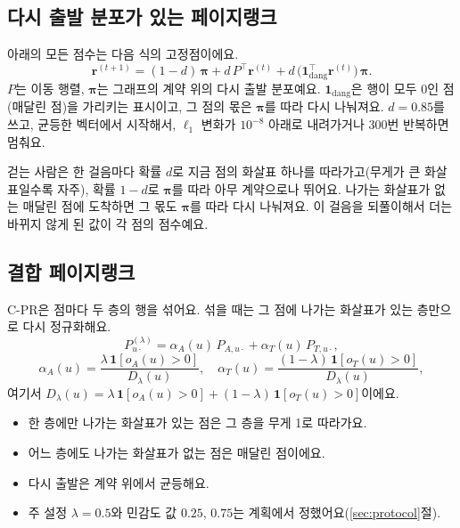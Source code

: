 \subsection{다시 출발 분포가 있는 페이지랭크}

아래의 모든 점수는 다음 식의 고정점이에요.
\begin{equation}
\mathbf r^{(t+1)}=(1-d)\,\boldsymbol\pi+d\,P^{\top}\mathbf r^{(t)}+d\,\bigl(\mathbf 1_{\mathrm{dang}}^{\top}\mathbf r^{(t)}\bigr)\,\boldsymbol\pi.
\label{eq:pr}
\end{equation}
$P$는 이동 행렬, $\boldsymbol\pi$는 그래프의 계약 위의 다시 출발 분포예요. $\mathbf 1_{\mathrm{dang}}$은 행이 모두 0인 점(매달린 점)을 가리키는 표시이고, 그 점의 몫은 $\boldsymbol\pi$를 따라 다시 나눠져요. $d=0.85$를 쓰고, 균등한 벡터에서 시작해서, $\ell_1$ 변화가 $10^{-8}$ 아래로 내려가거나 300번 반복하면 멈춰요.

\begin{puri}
걷는 사람은 한 걸음마다 확률 $d$로 지금 점의 화살표 하나를 따라가고(무게가 큰 화살표일수록 자주), 확률 $1-d$로 $\boldsymbol\pi$를 따라 아무 계약으로나 뛰어요. 나가는 화살표가 없는 매달린 점에 도착하면 그 몫도 $\boldsymbol\pi$를 따라 다시 나눠져요. 이 걸음을 되풀이해서 더는 바뀌지 않게 된 값이 각 점의 점수예요.
\end{puri}

\subsection{결합 페이지랭크}

C-PR은 점마다 두 층의 행을 섞어요. 섞을 때는 그 점에 나가는 화살표가 있는 층만으로 다시 정규화해요.
\begin{equation}
P^{(\lambda)}_{u\cdot}=\alpha_A(u)\,P_{A,u\cdot}+\alpha_T(u)\,P_{T,u\cdot},
\label{eq:cpr}
\end{equation}
\begin{equation}
\alpha_A(u)=\frac{\lambda\,\mathbf 1[o_A(u)>0]}{D_\lambda(u)},\quad
\alpha_T(u)=\frac{(1-\lambda)\,\mathbf 1[o_T(u)>0]}{D_\lambda(u)},
\label{eq:alpha}
\end{equation}
여기서 $D_\lambda(u)=\lambda\,\mathbf 1[o_A(u)>0]+(1-\lambda)\,\mathbf 1[o_T(u)>0]$이에요.
\begin{itemize}
\item 한 층에만 나가는 화살표가 있는 점은 그 층을 무게 1로 따라가요.
\item 어느 층에도 나가는 화살표가 없는 점은 매달린 점이에요.
\item 다시 출발은 계약 위에서 균등해요.
\item 주 설정 $\lambda=0.5$와 민감도 값 $0.25$, $0.75$는 계획에서 정했어요(\ref{sec:protocol}절).
\end{itemize}

